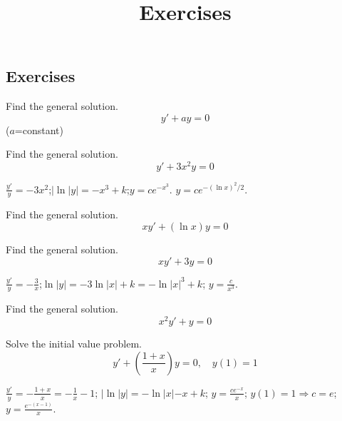 \documentclass{ximera}
\title{Exercises} \license{CC BY-NC-SA 4.0}
\begin{document}
\begin{abstract}
\end{abstract}
\maketitle

\begin{onlineOnly}
\section*{Exercises}
\end{onlineOnly}

\begin{problem}\label{exer:2.1.1} Find the general solution.
$$y'+ay=0$$
($a$=constant)
\end{problem}

\begin{problem}\label{exer:2.1.2} Find the general solution.
   $$y'+3x^2y=0$$ 



\begin{solution}
    $\frac{y'}{y}=-3x^2$;\quad $|\ln|y|=-x^3+k$;\quad $y=ce^{-x^3}$.
$y=ce^{-(\ln x)^2/2}$.
\end{solution}
\end{problem}

\begin{problem}\label{exer:2.1.3} Find the general solution.
$$xy'+(\ln x)y=0$$
\end{problem}

\begin{problem}\label{exer:2.1.4} Find the general solution.
$$xy'+3y=0$$



\begin{solution}
    $\frac{y'}{y}=-\frac{3}{x}$;\quad $\ln|y|=-3\ln|x|+k=-\ln|x|^3+k$;\quad
$y=\frac{c}{x^3}$.
\end{solution}
\end{problem}

\begin{problem}\label{exer:2.1.5} Find the general solution.
$$x^2y'+y=0$$ 
\end{problem}

 \begin{problem}\label{exer:2.1.6} Solve
the initial value problem.
$$y'+\left(\frac{1+x}{x}\right)y=0,\quad y(1)=1$$



\begin{solution}
    $\frac{y'}{y}=-\frac{1+x}{x}=-\frac{1}{x}-1$;\quad
$|\ln|y|=-\ln|x|-x+k$;\quad
$y=\frac{ce^{-x}}{x}$;\quad
$y(1)=1\Rightarrow
 c=e$;\quad
$y=\frac{e^{-(x-1)}}{x}$.
\end{solution}
\end{problem}
\end{document}
